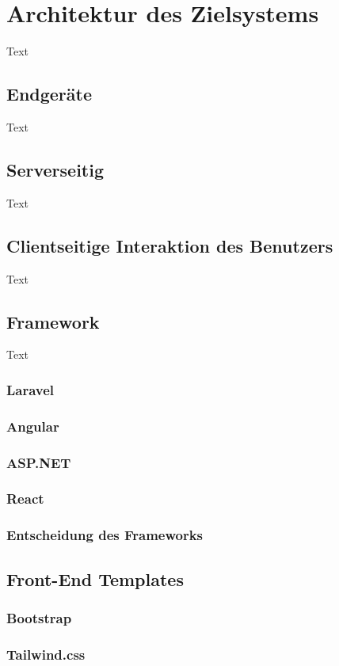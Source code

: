 \section{Architektur des Zielsystems}
Text

\subsection{Endgeräte}
Text

\subsection{Serverseitig}
Text

\subsection{Clientseitige Interaktion des Benutzers}
Text

\subsection{Framework}
Text

\subsubsection{Laravel}
\subsubsection{Angular}
\subsubsection{ASP.NET}
\subsubsection{React}
\subsubsection{Entscheidung des Frameworks}


\subsection{Front-End Templates}
\subsubsection{Bootstrap}
\subsubsection{Tailwind.css}
